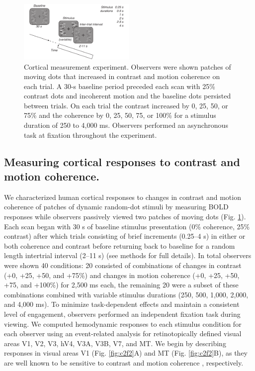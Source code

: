 \begin{figure}[ht]
\centering
\includegraphics[keepaspectratio,width=0.5\textwidth]{figs_c2/Fig1_task.pdf}
\caption[Cortical measurement experiment.]{Cortical measurement experiment. Observers were shown patches of moving dots that increased in contrast and motion coherence on each trial. A 30-s baseline period preceded each scan with 25\% contrast dots and incoherent motion and the baseline dots persisted between trials. On each trial the contrast increased by 0, 25, 50, or 75\% and the coherence by 0, 25, 50, 75, or 100\% for a stimulus duration of 250 to 4,000 ms. Observers performed an asynchronous task at fixation throughout the experiment.}
\label{fig:c2f1}
\end{figure}

\subsection{Measuring cortical responses to contrast and motion coherence.}

We characterized human cortical responses to changes in contrast and motion coherence of patches of dynamic random-dot stimuli by measuring BOLD responses while observers passively viewed two patches of moving dots (Fig. \ref{fig:c2f1}). Each scan began with 30 s of baseline stimulus presentation (0\% coherence, 25\% contrast) after which trials consisting of brief increments (0.25–4 s) in either or both coherence and contrast before returning back to baseline for a random length intertrial interval (2–11 s) (see methods for full details). In total observers were shown 40 conditions: 20 consisted of combinations of changes in contrast (+0, +25, +50, and +75\%) and changes in motion coherence (+0, +25, +50, +75, and +100\%) for 2,500 ms each, the remaining 20 were a subset of these combinations combined with variable stimulus durations (250, 500, 1,000, 2,000, and 4,000 ms). To minimize task-dependent effects and maintain a consistent level of engagement, observers performed an independent fixation task during viewing. We computed hemodynamic responses to each stimulus condition for each observer using an event-related analysis for retinotopically defined visual areas V1, V2, V3, hV4, V3A, V3B, V7, and MT. We begin by describing responses in visual areas V1 (Fig. \ref{fig:c2f2}A) and MT (Fig. \ref{fig:c2f2}B), as they are well known to be sensitive to contrast \citep{Avidan2002-jg,Boynton1996-ff,Gardner2005-pg,Logothetis2001-kk,Olman2004-dd,Tootell1995-gq,Tootell1998-mr} and motion coherence \citep{Britten1993-oh,Handel2007-xk,Rees2000-ul,Simoncelli1998-ts}, respectively.


